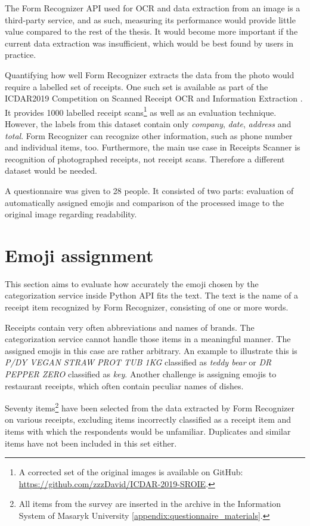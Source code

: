 \documentclass[
  digital, %
  table,   %
  oneside, %
  lof,     %
  lot,     %
]{fithesis3}
\begin{document}
The Form Recognizer API used for OCR and data extraction from an image is a third-party service, and as such, measuring its performance would provide little value compared to the rest of the thesis. It would become more important if the current data extraction was insufficient, which would be best found by users in practice.

Quantifying how well Form Recognizer extracts the data from the photo would require a labelled set of receipts. One such set is available as part of the ICDAR2019 Competition on Scanned Receipt OCR
and Information Extraction \cite{Huang2019ICDAR}. It provides \num{1000} labelled receipt scans\footnote{A corrected set of the original images is available on GitHub: \url{https://github.com/zzzDavid/ICDAR-2019-SROIE}.} as well as an evaluation technique. However, the labels from this dataset contain only \textit{company}, \textit{date}, \textit{address} and \textit{total}. Form Recognizer can recognize other information, such as phone number and individual items, too. Furthermore, the main use case in Receipts Scanner is recognition of photographed receipts, not receipt scans. Therefore a different dataset would be needed.

A questionnaire was given to 28 people. It consisted of two parts: evaluation of automatically assigned emojis and comparison of the processed image to the original image regarding readability.

\section{Emoji assignment}
This section aims to evaluate how accurately the emoji chosen by the categorization service inside Python API fits the text. The text is the name of a receipt item recognized by Form Recognizer, consisting of one or more words.

Receipts contain very often abbreviations and names of brands. The categorization service cannot handle those items in a meaningful manner. The assigned emojis in this case are rather arbitrary. An example to illustrate this is \textit{P/DY VEGAN STRAW PROT TUB 1KG} classified as \textit{ teddy bear} or \textit{DR PEPPER ZERO} classified as \textit{ key}. Another challenge is assigning emojis to restaurant receipts, which often contain peculiar names of dishes.

Seventy items\footnote{All items from the survey are inserted in the archive in the Information System of Masaryk University \ref{appendix:questionnaire_materials}.} have been selected from the data extracted by Form Recognizer on various receipts, excluding items incorrectly classified as a receipt item and items with which the respondents would be unfamiliar. Duplicates and similar items have not been included in this set either.
\end{document}

